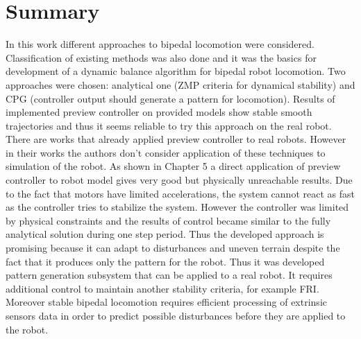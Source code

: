 \documentclass[12pt,a4paper]{report}
\begin{document}
	\chapter{Summary}
		In this work different approaches to bipedal locomotion were considered. Classification of existing methods was also done and it was the basics for development of a dynamic balance algorithm for bipedal robot locomotion. Two approaches were chosen: analytical one (ZMP criteria for dynamical stability) and CPG (controller output should generate a pattern for locomotion). Results of implemented preview controller on provided models show stable smooth trajectories and thus it seems reliable to try this approach on the real robot. There are works \cite{kajita2003biped, audren2014model} that already applied preview controller to real robots. However in their works the authors don't consider application of these techniques to simulation of the robot. As shown in Chapter 5 a direct application of preview controller to robot model gives very good but physically unreachable results. Due to the fact that motors have limited accelerations, the system cannot react as fast as the controller tries to stabilize the system. However the controller was limited by physical constraints and the results of control became similar to the fully analytical solution during one step period. Thus the developed approach is promising because it can adapt to disturbances and uneven terrain despite the fact that it produces only the pattern for the robot.
		Thus it was developed pattern generation subsystem that can be applied to a real robot. It requires additional control to maintain another stability criteria, for example FRI. Moreover stable bipedal locomotion requires efficient processing of extrinsic sensors data in order to predict possible disturbances before they are applied to the robot.
			
	
	
	
\end{document}
